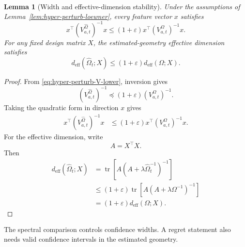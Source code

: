 \documentclass{article} %
\newtheorem{lemma}[theorem]{Lemma}
\begin{document}
\begin{lemma}[Width and effective-dimension stability]
\label{lem:hyper-perturb-width}
Under the assumptions of Lemma~\ref{lem:hyper-perturb-loewner}, every feature vector \(x\) satisfies
\begin{equation}
\label{eq:hyper-perturb-width}
x^\top
\left(V_{a,t}^{\widehat{\Omega}}\right)^{-1}
x
\le
(1+\varepsilon)
x^\top
\left(V_{a,t}^{\Omega}\right)^{-1}
x .
\end{equation}
For any fixed design matrix \(X\), the estimated-geometry effective dimension satisfies
\begin{equation}
\label{eq:hyper-perturb-deff}
d_{\mathrm{eff}}(\widehat{\Omega}_t;X)
\le
(1+\varepsilon)
d_{\mathrm{eff}}(\Omega;X).
\end{equation}
\end{lemma}

\begin{proof}
From \eqref{eq:hyper-perturb-V-lower}, inversion gives
\begin{equation}
\label{eq:hyper-perturb-width-proof-inv}
\left(V_{a,t}^{\widehat{\Omega}}\right)^{-1}
\preceq
(1+\varepsilon)
\left(V_{a,t}^{\Omega}\right)^{-1}.
\end{equation}
Taking the quadratic form in direction \(x\) gives
\begin{align}
\label{eq:hyper-perturb-width-proof-qf}
x^\top
\left(V_{a,t}^{\widehat{\Omega}}\right)^{-1}
x
&\le
(1+\varepsilon)
x^\top
\left(V_{a,t}^{\Omega}\right)^{-1}
x .
\end{align}
For the effective dimension, write
\begin{equation}
\label{eq:hyper-perturb-deff-proof-A}
A=X^\top X .
\end{equation}
Then
\begin{align}
\label{eq:hyper-perturb-deff-proof}
d_{\mathrm{eff}}(\widehat{\Omega}_t;X)
&=
\operatorname{tr}
\!\left[
A
\left(
A+\lambda\widehat{\Omega}_t^{-1}
\right)^{-1}
\right]
\\
&\le
(1+\varepsilon)
\operatorname{tr}
\!\left[
A
\left(
A+\lambda\Omega^{-1}
\right)^{-1}
\right]
\\
&=
(1+\varepsilon)
d_{\mathrm{eff}}(\Omega;X).
\end{align}
\end{proof}

The spectral comparison controls confidence widths. A regret statement also
needs valid confidence intervals in the estimated geometry.
\end{document}
